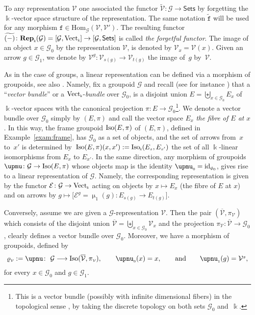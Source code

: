 \documentclass[10pt,a4paper]{amsart}
\numberwithin{equation}{section}
\renewcommand{\hom}[3]{\mathrm{Hom}_{\Sscript{#1}}\left(#2, #3\right)}
\newcommand{\td}[1]{\widetilde{#1}}
\newcommand{\bara}[1]{\overline{#1}}
\newcommand{\Rep}[1]{\mathbf{Rep}_{\Sscript{\Bbbk}}(#1)}
\newcommand{\Vect}{{\rm Vect}_{\Sscript{\Bbbk}}}
\newcommand{\tF}{\texttt{f}}
\newcommand{\Go}{\cG_{\Sscript{0}}}
\newcommand{\Ga}{\cG_{\Sscript{1}}}
\newcommand{\Vx}{\cV_{\Sscript{x}}}
\newcommand{\Vg}{\cV^{\Sscript{g}}}
\newcommand{\cE}{{\mathcal E}}
\newcommand{\cG}{{\mathcal G}}
\newcommand{\cV}{{\mathcal V}}
\newcommand{\Sets}{\mathsf{Sets}}
\newcommand{\Sscript}[1]{\scriptscriptstyle{#1}}
\begin{document}
To any representation $\cV$ one associated the functor $\tilde{\cV}\colon \cG \to \Sets$ by forgetting the $\Bbbk$-vector space structure of the representation. The same notation $\tilde{\tF}$ will be used for any morphism $\tF \in \hom{\cG}{\cV}{\cV'}$. The resulting functor $\td{(-)}\colon \Rep{\cG}=[\cG, \Vect] \to [\cG, \Sets]$ is called \emph{the forgetful functor}. The image of an object $x \in \Go$ by the representation $\cV$, is denoted by $\Vx=\cV(x)$. Given an arrow $g \in \Ga$, we denote by $\Vg\colon \cV_{\Sscript{s(g)}} \to \cV_{\Sscript{t(g)}}$ the image of~$g$ by~$\cV$.

\begin{Remark}\label{rem:FrameGrpd}As in the case of groups, a linear representation can be defined via a morphism of groupoids, see also \cite[Definition~1.11]{Renault:1980}. Namely, fix a groupoid $\cG$ and recall (see for instance \cite[p.~98]{Sternberg:1994}) that a ``\emph{vector bundle}'' or a $\Vect$-\emph{bundle} over $\Go$, is a disjoint union $E=\biguplus_{ x \in \Go}E_{\Sscript{x}}$ of $\Bbbk$-vector spaces with the canonical projection $\pi\colon E \to \Go$\footnote{This is a vector bundle (possibly with infinite dimensional fibers) in the topological sense \cite[Definition~2.1]{Karoubi:1978}, by taking the discrete topology on both sets $\Go$ and~$\Bbbk$.}. We denote a vector bundle over $\Go$ simply by $(E,\pi)$ and call the vector space $E_{\Sscript{x}}$ \emph{the fibre of $E$ at $x$}. In this way, the frame groupoid ${\rm Iso}(E,\pi)$ of $(E,\pi)$, defined in Example~\ref{exam:frame}, has $\Go$ as a set of objects, and the set of arrows from~$x$ to~$x'$ is determined by~${\rm Iso}(E,\pi)(x,x'):={\rm Iso}_{\Sscript{\Bbbk}}( E_{\Sscript{x}}, E_{\Sscript{x'}})$ the set of all $\Bbbk$-linear isomorphisms from $E_{\Sscript{x}}$ to $E_{\Sscript{x'}}$. In the same direction, any morphism of groupoids $\upmu\colon \cG \to {\rm Iso}(E,\pi)$ whose objects map is the identity $\upmu_{\Sscript{0}}={\rm id}_{\Sscript{\Go}}$, gives rise to a linear representation of $\cG$. Namely, the corresponding representation is given by the functor $\cE\colon \cG \to \Vect$ acting on objects by $x \mapsto E_{\Sscript{x}}$ (the fibre of $E$ at $x$) and on arrows by $g \mapsto \big[\cE^{\Sscript{g}}=\upmu_{\Sscript{1}}(g)\colon E_{\Sscript{s(g)}} \to E_{\Sscript{t(g)}}\big]$.

Conversely, assume we are given a $\cG$-representation $\cV$. Then the pair $(\bara{\cV}, \pi_{\Sscript{\cV}})$ which consists of the disjoint union $\bara{\cV}=\biguplus_{x \in \Go}\Vx$ and the projection $\pi_{\Sscript{\cV}}\colon \bar{\cV} \to \Go$, clearly defines a vector bundle over $\Go$. Moreover, we have a morphism of groupoids, defined by
\begin{gather}\label{Eq:rhoV}
\varrho_{\Sscript{\cV}}:=\upnu\colon \ \cG \longrightarrow {\rm Iso}(\bara{\cV}, \pi_{\Sscript{\cV}}), \qquad \upnu_{\Sscript{0}}(x)=x, \qquad \text{and} \qquad \upnu_{\Sscript{1}}(g)=\Vg,
\end{gather}
for every $x \in \Go$ and $g \in \Ga$.


\end{Remark}
\end{document}
